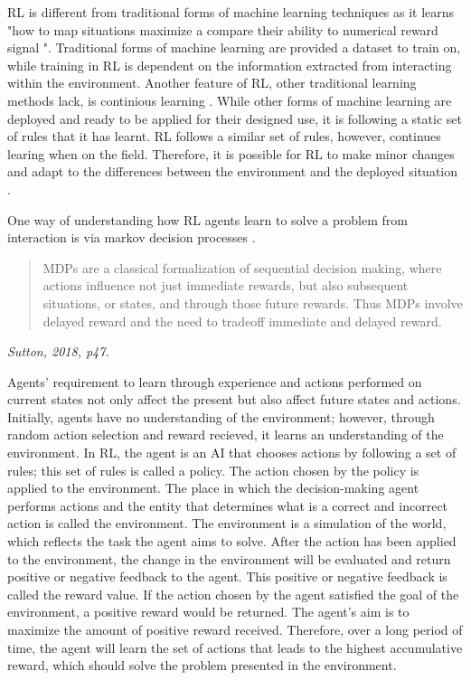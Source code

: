 RL is different from traditional forms of machine learning techniques as it learns "how to map situations maximize a compare their ability to numerical reward signal \cite{Sutton1}". Traditional forms of machine learning are provided a dataset to train on, while training in RL is dependent on the information extracted from interacting within the environment. Another feature of RL, other traditional learning methods lack, is continious learning \cite{sreenivas2022safe}. While other forms of machine learning are deployed and ready to be applied for their designed use, it is following a static set of rules that it has learnt. RL follows a similar set of rules, however, continues learing when on the field. Therefore, it is possible for RL to make minor changes and adapt to the differences between the environment and the deployed situation \cite{sreenivas2022safe}.

One way of understanding how RL agents learn to solve a problem from interaction is via markov decision processes \cite{Sutton1}.

\begin{quote}
MDPs are a classical formalization of sequential decision making,
where actions influence not just immediate rewards, but also subsequent situations, or
states, and through those future rewards. Thus MDPs involve delayed reward and the
need to tradeoff immediate and delayed reward.
\end{quote}
\hspace*{\fill} \textit{Sutton, 2018, p47.}

Agents' requirement to learn through experience and actions performed on current states not only affect the present but also affect future states and actions. Initially, agents have no understanding of the environment; however, through random action selection and reward recieved, it learns an understanding of the environment. In RL, the agent is an AI that chooses actions by following a set of rules; this set of rules is called a policy. The action chosen by the policy is applied to the environment. The place in which the decision-making agent performs actions and the entity that determines what is a correct and incorrect action is called the environment. The environment is a simulation of the world, which reflects the task the agent aims to solve. After the action has been applied to the environment, the change in the environment will be evaluated and return positive or negative feedback to the agent. This positive or negative feedback is called the reward value. If the action chosen by the agent satisfied the goal of the environment, a positive reward would be returned. The agent’s aim is to maximize the amount of positive reward received. Therefore, over a long period of time, the agent will learn the set of actions that leads to the highest accumulative reward, which should solve the problem presented in the environment. 

